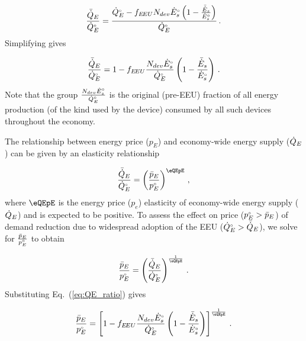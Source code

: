 \begin{equation}
  \frac{\bar{\dot{Q}}_E}{{}{\dot{Q}}^{\scriptscriptstyle \circ}_E} =
        \frac{{}{\dot{Q}}^{\scriptscriptstyle \circ}_E - f_{E\!EU} N_{dev} {}{\dot{E}}^{\scriptscriptstyle \circ}_s \left( 1 - \frac{\bar{\dot{E}}_s}{{}{\dot{E}}^{\scriptscriptstyle \circ}_s}  \right)}
        {{}{\dot{Q}}^{\scriptscriptstyle \circ}_E} \, .
\end{equation}
%
Simplifying gives

\begin{equation} \label{eq:QE_ratio}
  \frac{\bar{\dot{Q}}_E}{{}{\dot{Q}}^{\scriptscriptstyle \circ}_E} =
        1 - f_{E\!EU} \frac{N_{dev} {}{\dot{E}}^{\scriptscriptstyle \circ}_s}{{}{\dot{Q}}^{\scriptscriptstyle \circ}_E} \left( 1 - \frac{\bar{\dot{E}}_s}{{}{\dot{E}}^{\scriptscriptstyle \circ}_s}  \right) \, .
\end{equation}
%
Note that the group $\frac{N_{dev} {}{\dot{E}}^{\scriptscriptstyle \circ}_s}{{}{\dot{Q}}^{\scriptscriptstyle \circ}_E}$
is the original (pre-EEU) fraction of all energy production
(of the kind used by the device)
consumed by all such devices throughout the economy.

The relationship between energy price ($p_E$) and
economy-wide energy supply ($\dot{Q}_E$)
can be given by an elasticity relationship

\begin{equation}
  \frac{\rainc{Q}_E}{\rorig{Q}_E} = 
          \left( \frac{\ainc{p}_E}{\orig{p}_E} \right)^{\eQEpE} \, ,
\end{equation}
%
where $\eQEpE$ is the energy price ($p_e$) elasticity
of economy-wide energy supply ($\dot{Q}_E$)
and is expected to be positive.
To assess the effect on price
(${}{p}^{\scriptscriptstyle \circ}_E > \bar{p}_E$)
of demand reduction
due to widespread adoption of the EEU
(${}{\dot{Q}}^{\scriptscriptstyle \circ}_E > \bar{\dot{Q}}_E$),
we solve for $\frac{\bar{p}_E}{{}{p}^{\scriptscriptstyle \circ}_E}$
to obtain

\begin{equation}
  \frac{\ainc{p}_E}{\orig{p}_E} =
        \left( \frac{\rainc{Q}_E}{\rorig{Q}_E} \right)^{\frac{1}{\eQEpE}} \, .
\end{equation}
%
Substituting Eq.~(\ref{eq:QE_ratio}) gives

\begin{equation} \label{eq:price_effect_price_ratio}
  \frac{\ainc{p}_E}{\orig{p}_E} =
        \left[ 1 - f_{\EEU} \frac{N_{dev} \rbempl{E}_s}{\rbempl{Q}_E} \left( 1 - \frac{\rainc{E}_s}{\rbempl{E}_s}  \right) \right]^{\frac{1}{\eQEpE}} \, .
\end{equation}

